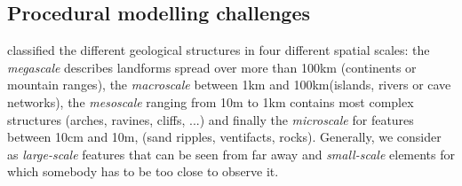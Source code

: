 



\subsection{Procedural modelling challenges}
\cite{ParisThesis} classified the different geological structures in four different spatial scales: the \textit{megascale} describes landforms spread over more than \si{100}{km} (continents or mountain ranges), the \textit{macroscale} between \si{1}{km} and \si{100}{km}(islands, rivers or cave networks), the \textit{mesoscale} ranging from \si{10}{m} to \si{1}{km} contains most complex structures (arches, ravines, cliffs, ...) and finally the \textit{microscale} for features between \si{10}{cm} and \si{10}{m}, (sand ripples, ventifacts, rocks). Generally, we consider as \textit{large-scale} features that can be seen from far away and \textit{small-scale} elements for which somebody has to be too close to observe it.

